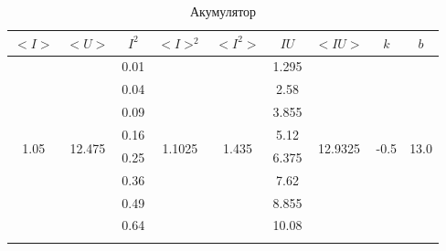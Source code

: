 \documentclass[a4paper,12pt]{article}
\begin{document}
\newpage
	\begin{table}[h]
		\centering
		\caption{Акумулятор}
		\begin{tabular}{|c|c|c|c|c|c|c|c|c|}
			\hline
			\textbf{$<I>$}         & \textbf{$<U>$}           & \textbf{$I^2$} & \textbf{$<I>^2$}         & \textbf{$<I^2>$}        & \textbf{$IU$} & \textbf{$<IU>$}           & \textbf{$k$}           & \textbf{$b$}           \\ \hline
			\multirow{20}{*}{1.05} & \multirow{20}{*}{12.475} & 0.01           & \multirow{20}{*}{1.1025} & \multirow{20}{*}{1.435} & 1.295         & \multirow{20}{*}{12.9325} & \multirow{20}{*}{-0.5} & \multirow{20}{*}{13.0} \\ \cline{3-3} \cline{6-6}
			&                          & 0.04           &                          &                         & 2.58          &                           &                        &                        \\ \cline{3-3} \cline{6-6}
			&                          & 0.09           &                          &                         & 3.855         &                           &                        &                        \\ \cline{3-3} \cline{6-6}
			&                          & 0.16           &                          &                         & 5.12          &                           &                        &                        \\ \cline{3-3} \cline{6-6}
			&                          & 0.25           &                          &                         & 6.375         &                           &                        &                        \\ \cline{3-3} \cline{6-6}
			&                          & 0.36           &                          &                         & 7.62          &                           &                        &                        \\ \cline{3-3} \cline{6-6}
			&                          & 0.49           &                          &                         & 8.855         &                           &                        &                        \\ \cline{3-3} \cline{6-6}
			&                          & 0.64           &                          &                         & 10.08         &                           &                        &                        \\ \cline{3-3} \cline{6-6}

\end{tabular}
\end{table}
\end{document}
